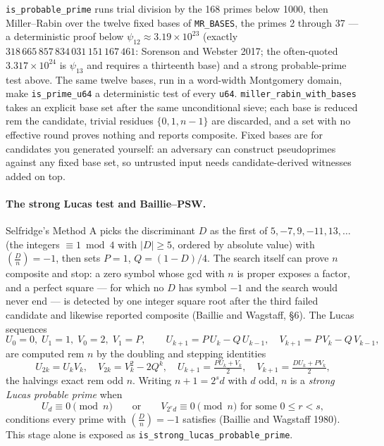 \documentclass[11pt]{article}
\newcommand{\code}[1]{\texttt{#1}}
\newcommand{\jac}[2]{\left(\frac{#1}{#2}\right)}
\begin{document}
\code{is\_probable\_prime} runs trial division by the 168 primes below
1000, then Miller--Rabin over the twelve fixed bases of \code{MR\_BASES},
the primes 2 through 37 --- a
deterministic proof below $\psi_{12} \approx 3.19 \times 10^{23}$
(exactly $318\,665\,857\,834\,031\,151\,167\,461$: Sorenson and Webster
2017; the often-quoted $3.317 \times 10^{24}$ is $\psi_{13}$ and requires
a thirteenth base) and a strong probable-prime test above. The same
twelve bases, run in a word-width Montgomery domain, make
\code{is\_prime\_u64} a deterministic test of every \code{u64}.
\code{miller\_rabin\_with\_bases} takes an
explicit base set after the same unconditional sieve; each base is reduced
rem the candidate, trivial residues $\{0, 1, n-1\}$ are discarded, and
a set with no effective round proves nothing and reports composite. Fixed
bases are for candidates you generated yourself: an adversary can
construct pseudoprimes against any fixed base set, so untrusted input
needs candidate-derived witnesses added on top.

\paragraph{The strong Lucas test and Baillie--PSW.} Selfridge's Method A
picks the discriminant $D$ as the first of $5, -7, 9, -11, 13, \ldots$
(the integers $\equiv 1 \bmod 4$ with $|D| \ge 5$, ordered by absolute
value) with $\jac{D}{n} = -1$, then sets $P = 1$, $Q = (1 - D)/4$. The
search itself can prove $n$ composite and stop: a zero symbol whose gcd
with $n$ is proper exposes a factor, and a perfect square --- for which no
$D$ has symbol $-1$ and the search would never end --- is detected by one
integer square root after the third failed candidate and likewise reported
composite (Baillie and Wagstaff, \S6). The Lucas sequences
\begin{equation}
U_0 = 0,\; U_1 = 1,\; V_0 = 2,\; V_1 = P,
\qquad
U_{k+1} = P\,U_k - Q\,U_{k-1},
\quad
V_{k+1} = P\,V_k - Q\,V_{k-1},
\end{equation}
are computed rem $n$ by the doubling and stepping identities
\begin{equation}
U_{2k} = U_k V_k,
\quad
V_{2k} = V_k^2 - 2Q^k,
\quad
U_{k+1} = \tfrac{P U_k + V_k}{2},
\quad
V_{k+1} = \tfrac{D U_k + P V_k}{2},
\end{equation}
the halvings exact rem odd $n$. Writing $n + 1 = 2^s d$ with $d$ odd,
$n$ is a \emph{strong Lucas probable prime} when
\begin{equation}
U_d \equiv 0 \pmod{n}
\qquad\text{or}\qquad
V_{2^r d} \equiv 0 \pmod{n} \text{ for some } 0 \le r < s,
\end{equation}
conditions every prime with $\jac{D}{n} = -1$ satisfies (Baillie and
Wagstaff 1980). This stage alone is exposed as
\code{is\_strong\_lucas\_probable\_prime}.
\end{document}
